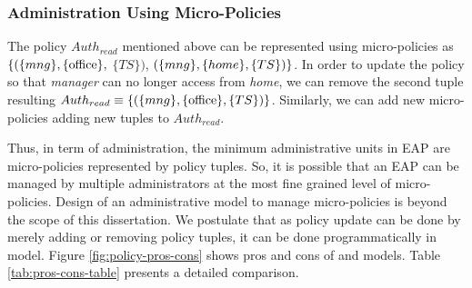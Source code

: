 \vspace{-1em}

\subsubsection{Administration Using Micro-Policies}
\label{sec:usefulness}

The policy $Auth_{read}$ mentioned above can be represented using micro-policies as $\{( \{mng\}, \{\text{office}\},$ $ \{TS\} )$, $( \{mng\}, \{home\}, \{TS\} )\}$. In order to update the policy so that \textit{manager} can no longer access from \textit{home}, we can remove the second tuple resulting $Auth_{read} \equiv \{( \{mng\}, \{\text{office}\}, \{TS\} )\}$. Similarly, we can add new micro-policies adding new tuples to $Auth_{read}$.

Thus, in term of administration, the minimum administrative units in EAP are micro-policies represented by policy tuples. So, it is possible that an EAP can be managed by multiple administrators at the most fine grained level of micro-policies. Design of an administrative model to manage micro-policies is beyond the scope of this dissertation. We postulate that as policy update can be done by merely adding or removing policy tuples,  it can be done programmatically  in \EPModels{} model. Figure \ref{fig:policy-pros-cons} shows pros and cons of \EPModels{} and \LPModels{} models. Table \ref{tab:pros-cons-table} presents a detailed comparison.




\vspace{-1em}






